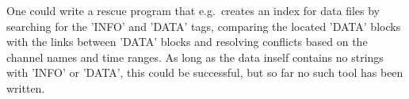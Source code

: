 One could write a rescue program that e.g.\ creates an index for data
files by searching for the 'INFO' and 'DATA' tags, comparing the
located 'DATA' blocks with the links between 'DATA' blocks and
resolving conflicts based on the channel names and time ranges.  As
long as the data inself contains no strings with 'INFO' or 'DATA', this could
be successful, but so far no such tool has been written.

